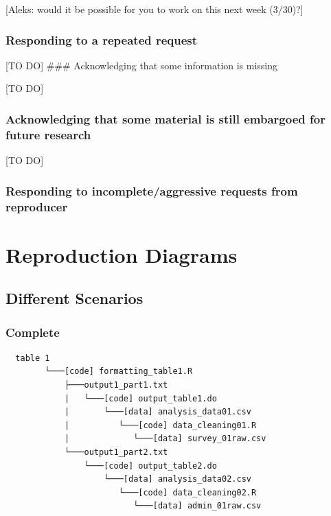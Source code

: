 \documentclass[]{book}
\begin{document}
{[}Aleks: would it be possible for you to work on this next week (3/30)?{]}

\hypertarget{responding-to-a-repeated-request}{%
\subsection{Responding to a repeated request}\label{responding-to-a-repeated-request}}

{[}TO DO{]}
\#\#\# Acknowledging that some information is missing

{[}TO DO{]}

\hypertarget{acknowledging-that-some-material-is-still-embargoed-for-future-research}{%
\subsection{Acknowledging that some material is still embargoed for future research}\label{acknowledging-that-some-material-is-still-embargoed-for-future-research}}

{[}TO DO{]}

\hypertarget{responding-to-incompleteaggressive-requests-from-reproducer}{%
\subsection{Responding to incomplete/aggressive requests from reproducer}\label{responding-to-incompleteaggressive-requests-from-reproducer}}

\hypertarget{reproduction-diagrams}{%
\chapter{Reproduction Diagrams}\label{reproduction-diagrams}}

\hypertarget{different-scenarios}{%
\section{Different Scenarios}\label{different-scenarios}}

\hypertarget{complete}{%
\subsection{Complete}\label{complete}}

\begin{verbatim}
  table 1
        └───[code] formatting_table1.R
            ├───output1_part1.txt  
            |   └───[code] output_table1.do           
            |       └───[data] analysis_data01.csv
            |          └───[code] data_cleaning01.R
            |             └───[data] survey_01raw.csv
            └───output1_part2.txt  
                └───[code] output_table2.do           
                    └───[data] analysis_data02.csv
                       └───[code] data_cleaning02.R
                          └───[data] admin_01raw.csv  
\end{verbatim}
\end{document}
